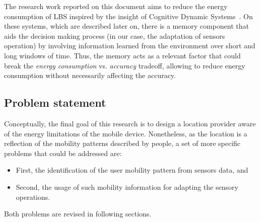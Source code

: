 \documentclass[ENG,PhD]{cinvestav}
\begin{document}
The research work reported on this document aims to reduce the energy consumption of LBS inspired by the insight of Cognitive Dynamic Systems~\cite{Haykin2006}.
On these systems, which are described later on, there is a memory component that aids the decision making process (in our case, the adaptation of sensors operation) by involving information learned from the environment over short and long windows of time.
Thus, the memory acts as a relevant factor that could break the \emph{energy consumption} vs. \emph{accuracy} tradeoff, allowing to reduce energy consumption without necessarily affecting the accuracy.


\subsection{Problem statement}
Conceptually, the final goal of this research is to design a location provider aware of the energy limitations of the mobile device.
Nonetheless, as the location is a reflection of the mobility patterns described by people, a set of more specific problems that could be addressed are:
\begin{itemize}
  \item First, the identification of the user mobility pattern from sensors data, and
  \item Second, the usage of such mobility information for adapting the sensory operations.
\end{itemize}

Both problems are revised in following sections.
\end{document}
